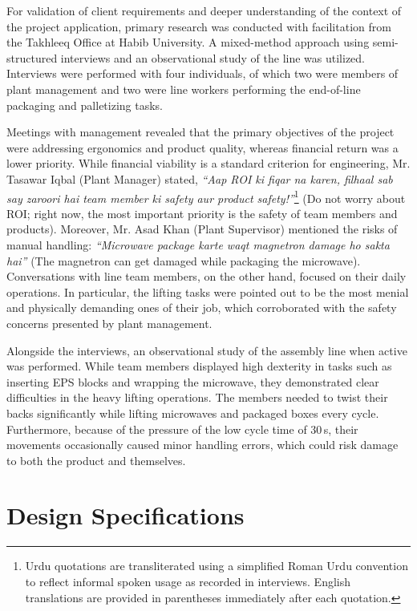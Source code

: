 For validation of client requirements and deeper understanding of the context of the project application, primary research was conducted with facilitation from the Takhleeq Office at Habib University. A mixed-method approach using semi-structured interviews and an observational study of the line was utilized. Interviews were performed with four individuals, of which two were members of plant management and two were line workers performing the end-of-line packaging and palletizing tasks.

Meetings with management revealed that the primary objectives of the project were addressing ergonomics and product quality, whereas financial return was a lower priority. While financial viability is a standard criterion for engineering, Mr. Tasawar Iqbal (Plant Manager) stated, \textit{``Aap ROI ki fiqar na karen, filhaal sab say zaroori hai team member ki safety aur product safety!''}\footnote{Urdu quotations are transliterated using a simplified Roman Urdu convention to reflect informal spoken usage as recorded in interviews. English translations are provided in parentheses immediately after each quotation.} (Do not worry about ROI; right now, the most important priority is the safety of team members and products). Moreover, Mr. Asad Khan (Plant Supervisor) mentioned the risks of manual handling: \textit{``Microwave package karte waqt magnetron damage ho sakta hai''} (The magnetron can get damaged while packaging the microwave). Conversations with line team members, on the other hand, focused on their daily operations. In particular, the lifting tasks were pointed out to be the most menial and physically demanding ones of their job, which corroborated with the safety concerns presented by plant management.

Alongside the interviews, an observational study of the assembly line when active was performed. While team members displayed high dexterity in tasks such as inserting EPS blocks and wrapping the microwave, they demonstrated clear difficulties in the heavy lifting operations. The members needed to twist their backs significantly while lifting microwaves and packaged boxes every cycle. Furthermore, because of the pressure of the low cycle time of 30\,s, their movements occasionally caused minor handling errors, which could risk damage to both the product and themselves.

\section{Design Specifications}

